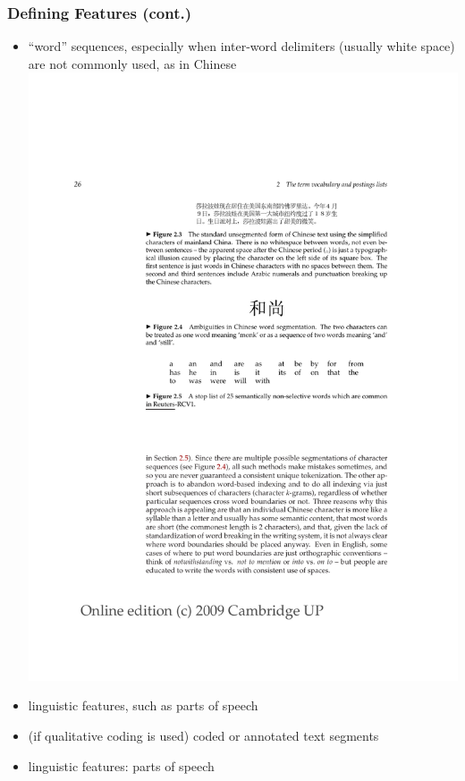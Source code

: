 \documentclass[11pt,handout]{beamer}
\begin{document}
\begin{frame}
 \frametitle{Defining Features (cont.)}
 \begin{itemize}
  \item ``word'' sequences, especially when inter-word delimiters
        (usually white space) are not commonly used, as in Chinese
        \includegraphics{chinese.pdf}
  \item linguistic features, such as parts of speech
  \item (if qualitative coding is used) coded or annotated text
        segments
  \item linguistic features: parts of speech
 \end{itemize}
\end{frame}
\end{document}
